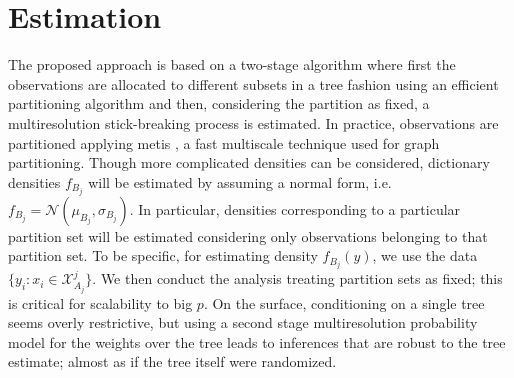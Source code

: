 \documentclass{article}
\providecommand{\mc}[1]{\mathcal{#1}}
\begin{document}
\section{Estimation}

The proposed approach is based on a two-stage algorithm where first the observations are allocated to different subsets in a tree fashion using an efficient partitioning algorithm and then, considering the partition as fixed, a multiresolution stick-breaking process is estimated. In practice, observations are partitioned applying metis \cite{metis}, a fast multiscale technique used for graph partitioning. 
Though more complicated densities can be considered, dictionary densities $f_{B_j}$ will be estimated by assuming a normal form, i.e. $f_{B_j}=\mc{N}(\mu_{B_j},\sigma_{B_j})$. In particular, densities corresponding to a particular partition set will be estimated considering only observations belonging to that partition set. To be specific, for estimating density $f_{B_j}(y)$, we use the data $\{ y_i: x_i \in \mathcal{X}^j_{A_j} \}$. We then conduct the analysis treating partition sets as fixed; this is critical for scalability to big $p$.  On the surface, conditioning on a single tree seems overly restrictive, but using a second stage multiresolution probability model for the weights over the tree leads to inferences that are robust to the tree estimate; almost as if the tree itself were randomized.
\end{document}
